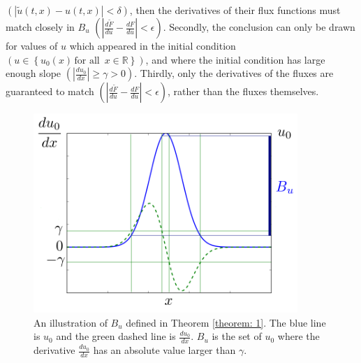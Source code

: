 $\left(|\tilde{u}(t,x)-u(t,x)| < \delta\right)$, then
the derivatives of their flux functions must match closely in $B_u$ $\left(\left|\frac{d\tilde{F}}{du} - \frac{dF}{du}\right| < 
\epsilon\right)$. 
Secondly, the conclusion 
can only be drawn for values of $u$ which appeared in the initial condition $\left(u\in \left\{u_0(x)\, \textrm{for all } \, x\in \mathbb{R}\right\}\right)$, 
and where the initial condition has large enough slope $\left(\left|\frac{du_0}{dx}\right|\ge \gamma > 0\right)$.
Thirdly, only the derivatives of the fluxes are guaranteed to match $\left(\left|\frac{d\tilde{F}}{du} - \frac{dF}{du}\right| < \epsilon\right)$,
rather than the fluxes themselves. 

\begin{figure}[htbp]
    \begin{center}
        \includegraphics[width=10cm]{../excitedDomain.png}
        \caption{An illustration of $B_u$ defined in Theorem \ref{theorem: 1}. The blue line is $u_0$ 
        and the green dashed line is $\frac{du_0}{dx}$. $B_u$ is the set of $u_0$ where the derivative 
        $\frac{du_0}{dx}$ has an absolute value larger than $\gamma$.}
        \label{fig: excitedDomain}
    \end{center}
\end{figure}

